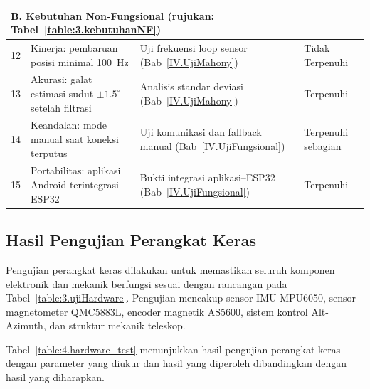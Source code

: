 \begin{longtable}{|b{}|p{}|p{}|p{}|}
    \multicolumn{4}{|l|}{\textbf{B. Kebutuhan Non-Fungsional (rujukan: Tabel~\ref{table:3.kebutuhanNF})}} \\ \hline
    12 & Kinerja: pembaruan posisi minimal 100~Hz & Uji frekuensi loop sensor (Bab~\ref{IV.UjiMahony}) & Tidak Terpenuhi \\ \hline
    13 & Akurasi: galat estimasi sudut $\pm 1.5^{\circ}$ setelah filtrasi & Analisis standar deviasi (Bab~\ref{IV.UjiMahony}) & Terpenuhi \\ \hline
    14 & Keandalan: mode manual saat koneksi terputus & Uji komunikasi dan fallback manual (Bab~\ref{IV.UjiFungsional}) & Terpenuhi sebagian \\ \hline
    15 & Portabilitas: aplikasi Android terintegrasi ESP32 & Bukti integrasi aplikasi--ESP32 (Bab~\ref{IV.UjiFungsional}) & Terpenuhi \\ \hline
\end{longtable}


\subsection{Hasil Pengujian Perangkat Keras} \label{IV.UjiHardware}
Pengujian perangkat keras dilakukan untuk memastikan seluruh komponen elektronik dan mekanik berfungsi sesuai dengan rancangan pada Tabel~\ref{table:3.ujiHardware}. Pengujian mencakup sensor IMU MPU6050, sensor magnetometer QMC5883L, encoder magnetik AS5600, sistem kontrol Alt-Azimuth, dan struktur mekanik teleskop. \par

Tabel~\ref{table:4.hardware_test} menunjukkan hasil pengujian perangkat keras dengan parameter yang diukur dan hasil yang diperoleh dibandingkan dengan hasil yang diharapkan.

